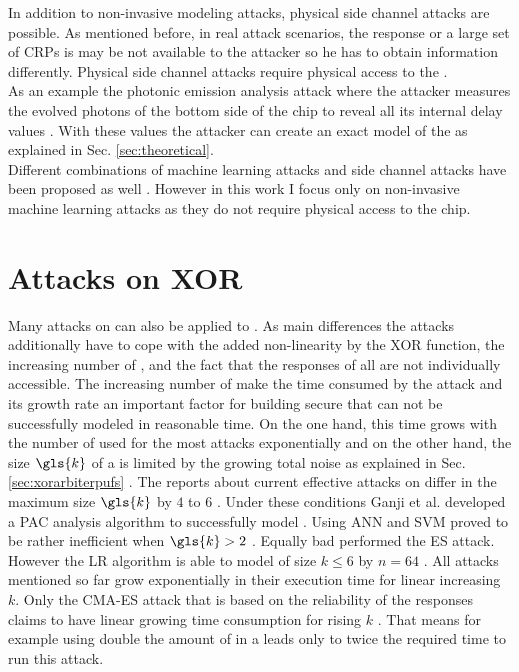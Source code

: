 In addition to non-invasive modeling attacks, physical side channel attacks are possible.
As mentioned before, in real attack scenarios, the \puf response or a large set of \acp{CRP} is may be not available to the attacker so he has to obtain information differently.
Physical side channel attacks require physical access to the \puf.\\
As an example the photonic emission analysis attack where the attacker measures the evolved photons of the bottom side of the \apuf chip to reveal all its internal delay values \cite{Tajik2014PhysicalPUFs}.
With these values the attacker can create an exact model of the \apuf as explained in Sec. \ref{sec:theoretical}.\\
Different combinations of machine learning attacks and side channel attacks have been proposed as well \cite{Mahmoud2013CombinedPUFs, Xu2014Hybrid}.
However in this work I focus only on non-invasive machine learning attacks as they do not require physical access to the \apuf chip.


\section{Attacks on \acs{XOR} \apufs}
\label{sec:attacksonxorarbiter}

Many attacks on \apufs can also be applied to \xpufs.
As main differences the attacks additionally have to cope with the added non-linearity by the \ac{XOR} function, the increasing number of \apufs, and the fact that the responses of all \apufs are not individually accessible.
The increasing number of \apufs make the time consumed by the attack and its growth rate an important factor for building secure \xpufs that can not be successfully modeled in reasonable time.
On the one hand, this time grows with the number of used \apufs for the most attacks exponentially and on the other hand, the size $\gls{k}$ of a \xpuf is limited by the growing total noise as explained in Sec. \ref{sec:xorarbiterpufs} \cite{Ruhrmair2010ModelingFunctions}.
The reports about current effective attacks on \xpufs differ in the maximum size $\gls{k}$ by $4$ to $6$ \cite{Ganji2015WhyPUFs, Xu2014Hybrid}.
Under these conditions Ganji et al. developed a \ac{PAC} analysis algorithm to successfully model \xpufs \cite{Ganji2015WhyPUFs}.
Using \ac{ANN} and \ac{SVM} proved to be rather inefficient when $\gls{k} > 2$ \cite{Hospodar2012MachineUsability}.
Equally bad performed the \ac{ES} attack.
However the \ac{LR} algorithm is able to model \xpufs of size $k \le 6$ by $n = 64$ \cite{Ruhrmair2010ModelingFunctions}.
All attacks mentioned so far grow exponentially in their execution time for linear increasing $k$.
Only the \ac{CMA-ES} attack that is based on the reliability of the responses claims to have linear growing time consumption for rising $k$ \cite{Becker2015ThePUFs}.
That means for example using double the amount of \apufs in a \xpufs leads only to twice the required time to run this attack.

